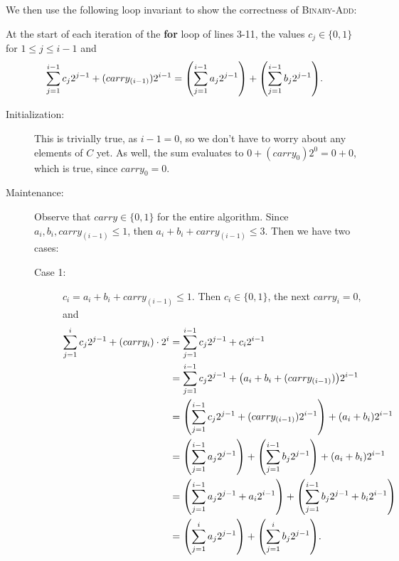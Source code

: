 \documentclass[Chapter02]{subfiles}
\begin{document}
\begin{enumerate}
\begin{answer}
			We then use the following loop invariant to show the correctness of \textsc{Binary-Add}:

			\begin{addmargin}[2em]{2em}
				At the start of each iteration of the \textbf{for} loop of lines 3-11, the values $c_j \in \{0,1\}$ for $1 \leq j \leq i - 1$ and
				\[
					\sum_{j = 1}^{i - 1} c_j2^{j - 1} + (carry_{(i - 1)})2^{i-1} = \qty(\sum_{j = 1}^{i - 1} a_j 2^{j - 1}) + \qty(\sum_{j = 1}^{i - 1} b_j 2^{j - 1}).
				\]
			\end{addmargin}

			\begin{description}
				\item[Initialization:] This is trivially true, as $i - 1 = 0$, so we don't have to worry about any elements of $C$ yet. As well, the sum evaluates to $0 + (carry_0)2^0 = 0 + 0$, which is true, since $carry_0 = 0$.

				\item[Maintenance:] Observe that $carry \in \{0,1\}$ for the entire algorithm. Since $a_i, b_i, carry_{(i - 1)} \leq 1$, then $a_i + b_i + carry_{(i - 1)} \leq 3$. Then we have two cases:
				\begin{description}
					\item[Case 1:] $c_i = a_i + b_i + carry_{(i - 1)} \leq 1$. Then $c_i \in \{0, 1\}$, the next $carry_i = 0$, and
					\begin{align*}
						\sum_{j = 1}^{i} c_j2^{j - 1} + (carry_i) \cdot 2^{i} &= \sum_{j = 1}^{i - 1} c_j2^{j - 1} + c_i2^{i - 1}\\
							&= \sum_{j = 1}^{i - 1} c_j2^{j - 1} + \qty(a_i + b_i + (carry_{(i - 1)}))2^{i - 1}\\
							&= \qty(\sum_{j = 1}^{i - 1} c_j2^{j - 1} + (carry_{(i - 1)})2^{i - 1}) + (a_i + b_i)2^{i - 1}\\
							&= \qty(\sum_{j = 1}^{i - 1} a_j 2^{j - 1}) + \qty(\sum_{j = 1}^{i - 1} b_j 2^{j - 1}) + (a_i + b_i)2^{i - 1}\\
							&= \qty(\sum_{j = 1}^{i - 1} a_j 2^{j - 1} + a_i2^{i - 1}) + \qty(\sum_{j = 1}^{i - 1} b_j 2^{j - 1} + b_i2^{i-1})\\
							&= \qty(\sum_{j = 1}^i a_j 2^{j - 1}) + \qty(\sum_{j = 1}^i b_j 2^{j - 1}).
					\end{align*}


\end{description}
\end{description}
\end{answer}
\end{enumerate}
\end{document}
